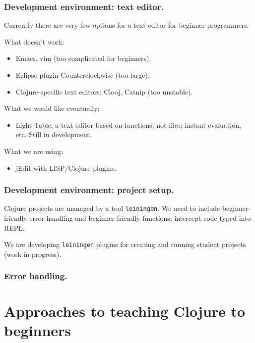 \documentclass{beamer}
\begin{document}
\begin{frame}
\frametitle{Development environment: text editor.}
Currently there are very few options for a text editor for beginner programmers. 

What doesn't work:
\begin{itemize}
\item Emacs, vim (too complicated for beginners).
\item Eclipse plugin Counterclockwise (too large).
\item Clojure-specific text editors: Clooj, Catnip (too unstable). 
\end{itemize}
What we would like eventually:
\begin{itemize}
\item Light Table: a text editor based on functions, not files; instant evaluation, etc. Still in development. 
\end{itemize}
What we are using:
\begin{itemize}
\item jEdit with LISP/Clojure plugins. 
\end{itemize}
\end{frame}

\begin{frame}
\frametitle{Development environment: project setup.}
Clojure projects are managed by a tool {\tt leiningen}. We need to include beginner-friendly error handling and beginner-friendly functions; intercept code typed into REPL. 

We are developing {\tt leiningen} plugins for creating and running student projects (work in progress). 
\end{frame}

\begin{frame}
\frametitle{Error handling.}

\end{frame}

\section{Approaches to teaching Clojure to beginners}
\end{document}
